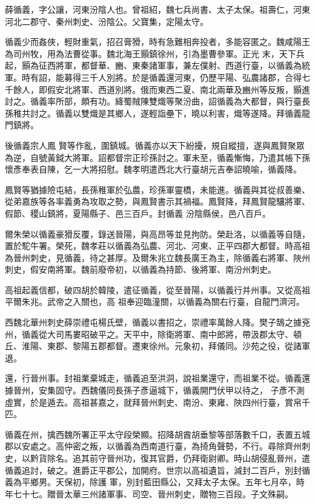 \begin{pinyinscope}
 薛循義，字公讓，河東汾陰人也。曾祖紹，魏七兵尚書、太子太保。祖壽仁，河東河北二郡守、秦州刺史、汾陰公。父寶集，定陽太守。



 循義少而姦俠，輕財重氣，招召膏猾，時有急難相奔投者，多能容匿之。魏咸陽王為司州牧，用為法曹從事。魏北海王顥鎮徐州，引為墨曹參軍。正光
 末，天下兵起，顥為征西將軍，都督華、豳、東秦諸軍事，兼左僕射、西道行臺，以循義為統軍。時有詔，能募得三千人別將。於是循義還河東，仍歷平陽、弘農諸郡，合得七千餘人，即假安北將軍、西道別將。俄而東西二夏、南北兩華及豳州等反叛，顥進討之。循義率所部，頗有功。絳蜀賊陳雙熾等聚汾曲，詔循義為大都督，與行臺長孫稚共討之。循義以雙熾是其鄉人，遂輕詣壘下，曉以利害，熾等遂降。拜循義龍門鎮將。



 後循義宗人鳳
 賢等作亂，圍鎮城。循義亦以天下紛擾，規自縱擅，遂與鳳賢聚眾為逆，自號黃鉞大將軍。詔都督宗正珍孫討之。軍未至，循義慚悔，乃遣其帳下孫懷彥奉表自陳，乞一大將招慰。魏孝明遣西北大行臺胡元吉奉詔曉喻，循義降。



 鳳賢等猶據險屯結，長孫稚軍於弘農，珍孫軍靈橋，未能進。循義與其從叔善樂、從弟嘉族等各率義勇為攻取之勢，與鳳賢書示其禍福。鳳賢降，拜鳳賢龍驤將軍、假節、稷山鎮將，夏陽縣子、邑三百戶。封循義
 汾陰縣侯，邑八百戶。



 爾朱榮以循義豪猾反覆，錄送晉陽，與高昂等並見拘防。榮赴洛，以循義等自隨，置於駝牛署。榮死，魏孝莊以循義為弘農、河北、河東、正平四郡大都督。時高祖為晉州刺史，見循義，待之甚厚。及爾朱兆立魏長廣王為主，除循義右將軍、陜州刺史，假安南將軍。魏前廢帝初，以循義為持節、後將軍、南汾州刺史。



 高祖起義信都，破四胡於韓陵，遣征循義，從至晉陽，以循義行并州事。又從高祖平爾朱兆。武帝之入關也，高
 祖奉迎臨潼關，以循義為關右行臺，自龍門濟河。



 西魏北華州刺史薛崇禮屯楊氏壁，循義以書招之，崇禮率萬餘人降。樊子鵠之據兗州，循義從大司馬婁昭破平之。天平中，除衛將軍、南中郎將，帶汲郡太守、頓丘、淮陽、東郡、黎陽五郡都督。遷東徐州。元象初，拜儀同。沙苑之役，從諸軍退。



 還，行晉州事。封祖業棄城走，循義追至洪洞，說祖業還守，而祖業不從。循義還據晉州，安集固守。西魏儀同長孫子彥逼城下，循義開門伏甲以待之，
 子彥不測虛實，於是遁去。高祖甚嘉之，就拜晉州刺史、南汾、東雍、陜四州行臺，賞帛千匹。



 循義在州，擒西魏所署正平太守段榮顯。招降胡酋胡垂黎等部落數千口，表置五城郡以安處之。高仲密之叛，以循義為西南道行臺，為掎角聲勢，不行。尋除齊州刺史，以黔貨除名。追其前守晉州功，復其官爵，仍拜衛尉卿。時山胡侵亂晉州，遣循義追討，破之。進爵正平郡公，加開府。世宗以高祖遺旨，減封二百戶，別封循義為平鄉男。天保初，除護
 軍，別封藍田縣公，又拜太子太保。五年七月卒，時年七十七。贈晉太華三州諸軍事、司空、晉州刺史，贈物三百段。子文殊嗣。




\end{pinyinscope}
